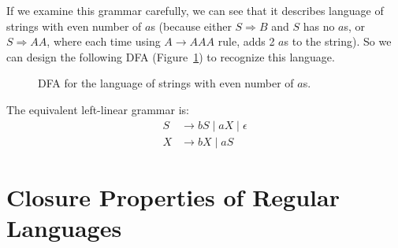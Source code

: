 \documentclass{article}
\numberwithin{equation}{subsection}
\begin{document}
\subsubsection{}
If we examine this grammar carefully, we can see that it describes language of strings with even number of \(a\)s (because either \(S\Rightarrow B\) and \(S\) has no \(a\)s, or \(S\Rightarrow AA\), where each time using \(A\to AAA\) rule, adds 2 \(a\)s to the string).
So we can design the following DFA (Figure~\ref{fig:automata3-4-b}) to recognize this language.
\begin{figure}[H]
\centering

\caption{DFA for the language of strings with even number of \(a\)s.}
\label{fig:automata3-4-b}
\end{figure}
The equivalent left-linear grammar is:
\begin{equation}
\begin{aligned}
S &\rightarrow bS \mid aX \mid \epsilon\\    
X &\rightarrow bX \mid aS
\end{aligned}
\end{equation}

\section{Closure Properties of Regular Languages}
\end{document}
